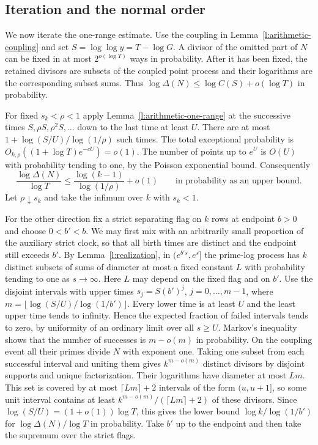 \documentclass[11pt]{article}
\numberwithin{equation}{section}
\begin{document}
\subsection{Iteration and the normal order}

We now iterate the one-range estimate. Use the coupling in Lemma~\ref{l:arithmetic-coupling} and set
$S=\log\log y=T-\log G$. A divisor of the omitted part of $N$ can
be fixed in at most $2^{o(\log T)}$ ways in probability. After it
has been fixed, the retained divisors are subsets of the coupled
point process and their logarithms are the corresponding subset sums.
Thus $\log\Delta(N)\le\log C(S)+o(\log T)$ in probability.

For fixed $s_k<\rho<1$ apply Lemma~\ref{l:arithmetic-one-range}
at the successive times $S,\rho S,\rho^2 S,\ldots$ down to the
last time at least $U$. There are at most
$1+\log(S/U)/\log(1/\rho)$ such times. The total exceptional
probability is $O_{k,\rho}((1+\log T)e^{-cU})=o(1)$. The number
of points up to $e^U$ is $O(U)$ with probability tending to one,
by the Poisson exponential bound. Consequently
\[
 \frac{\log\Delta(N)}{\log T}
 \le\frac{\log(k-1)}{\log(1/\rho)}+o(1)
 \qquad\text{in probability as an upper bound.}
\]
Let $\rho\downarrow s_k$ and take the infimum over $k$ with $s_k<1$.

For the other direction fix a strict separating flag on $k$ rows
at endpoint $b>0$ and choose $0<b'<b$. We may first mix with
an arbitrarily small proportion of the auxiliary strict clock, so
that all birth times are distinct and the endpoint still exceeds
$b'$. By
Lemma~\ref{l:realization}, in $(e^{b's},e^s]$ the prime-log
process has $k$ distinct subsets of sums of diameter at most a
fixed constant $L$ with probability tending to one as $s\to\infty$.
Here $L$ may depend on the fixed flag and on $b'$. Use the disjoint
intervals with upper times $s_j=S(b')^j$, $j=0,\ldots,m-1$,
where $m=\lfloor\log(S/U)/\log(1/b')\rfloor$. Every lower time
is at least $U$ and the least upper time tends to infinity. Hence
the expected fraction of failed intervals tends to zero, by
uniformity of an ordinary limit over all $s\ge U$. Markov's
inequality shows that the number of successes is $m-o(m)$ in
probability. On the coupling event all their primes divide $N$
with exponent one. Taking one subset from each successful interval
and uniting them gives $k^{m-o(m)}$ distinct divisors by disjoint
supports and unique factorization. Their logarithms have diameter
at most $Lm$. This set is covered by at most $\lceil Lm\rceil+2$
intervals of the form $(u,u+1]$, so some unit interval contains
at least $k^{m-o(m)}/(\lceil Lm\rceil+2)$ of these divisors.
Since $\log(S/U)=(1+o(1))\log T$, this gives the lower bound
$\log k/\log(1/b')$ for $\log\Delta(N)/\log T$ in probability.
Take $b'$ up to the endpoint and then take the supremum over the
strict flags.
\end{document}
